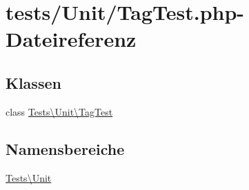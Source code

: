 \hypertarget{TagTest_8php}{}\section{tests/\+Unit/\+Tag\+Test.php-\/\+Dateireferenz}
\label{TagTest_8php}
\subsection*{Klassen}
\begin{DoxyCompactItemize}
\item 
class \hyperlink{classTests_1_1Unit_1_1TagTest}{Tests\textbackslash{}\+Unit\textbackslash{}\+Tag\+Test}
\end{DoxyCompactItemize}
\subsection*{Namensbereiche}
\begin{DoxyCompactItemize}
\item 
 \hyperlink{namespaceTests_1_1Unit}{Tests\textbackslash{}\+Unit}
\end{DoxyCompactItemize}
